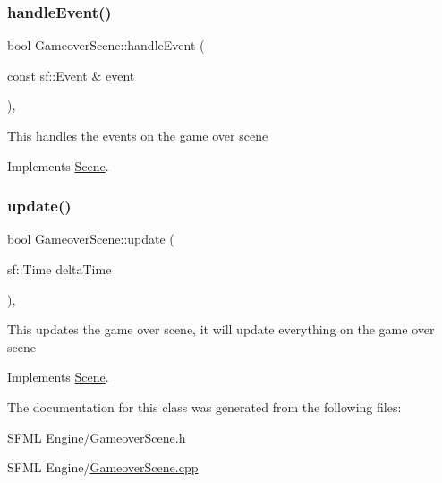\subsubsection{\texorpdfstring{handle\+Event()}{handleEvent()}}
{\footnotesize\ttfamily bool Gameover\+Scene\+::handle\+Event (\begin{DoxyParamCaption}\item[{const sf\+::\+Event \&}]{event }\end{DoxyParamCaption})\hspace{0.3cm}{\ttfamily [override]}, {\ttfamily [virtual]}}

This handles the events on the game over scene 

Implements \hyperlink{class_scene_af25e4d2c998aca4e95899fb67488e815}{Scene}.

\mbox{\label{class_gameover_scene_a6b7f650af840f54c78b4fb1cdf2010df}} 
\subsubsection{\texorpdfstring{update()}{update()}}
{\footnotesize\ttfamily bool Gameover\+Scene\+::update (\begin{DoxyParamCaption}\item[{sf\+::\+Time}]{delta\+Time }\end{DoxyParamCaption})\hspace{0.3cm}{\ttfamily [override]}, {\ttfamily [virtual]}}

This updates the game over scene, it will update everything on the game over scene 

Implements \hyperlink{class_scene_a72683c984a1da2ce4f757705e93730f2}{Scene}.



The documentation for this class was generated from the following files\+:\begin{DoxyCompactItemize}
\item 
S\+F\+M\+L Engine/\hyperlink{_gameover_scene_8h}{Gameover\+Scene.\+h}\item 
S\+F\+M\+L Engine/\hyperlink{_gameover_scene_8cpp}{Gameover\+Scene.\+cpp}\end{DoxyCompactItemize}
